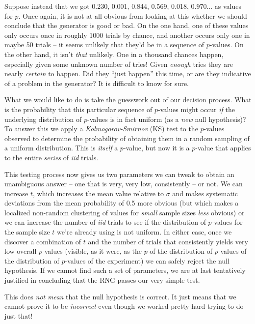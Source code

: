 \documentclass[12pt]{book}
\begin{document}
Suppose instead that we got 0.230, 0.001, 0.844, 0.569, 0.018, 0.970...
as values for $p$.  Once again, it is not at all obvious from looking at
this whether we should conclude that the generator is good or bad.  On
the one hand, one of these values only occurs once in roughly 1000
trials by chance, and another occurs only one in maybe 50 trials -- it
seems unlikely that they'd be in a sequence of $p$-values.  On the other
hand, it isn't {\em that} unlikely.  One in a thousand chances happen,
especially given some unknown number of tries!  Given \emph{enough}
tries they are nearly \emph{certain} to happen.  Did they ``just
happen'' this time, or are they indicative of a problem in the
generator?  It is difficult to know for sure.

What we would like to do is take the guesswork out of our decision
process.  What is the probability that this particular sequence of
$p$-values might occur {\em if} the underlying distribution of
$p$-values is in fact uniform (as a {\em new} null hypothesis)?  To
answer this we apply a {\em Kolmogorov-Smirnov} (KS) test to the
$p$-values observed to determine the probability of obtaining them in a
random sampling of a uniform distribution.  This is {\em itself} a
$p$-value, but now it is a $p$-value that applies to the entire {\em
series} of {\em iid} trials.

This testing process now gives us two parameters we can tweak to obtain
an unambiguous answer -- one that is very, very low, consistently -- or
not.  We can increase $t$, which increases the mean value relative to
$\sigma$ and makes systematic deviations from the mean probability of 0.5
more obvious (but which makes a localized non-random clustering of
values for {\em small} sample sizes {\em less} obvious) or we can
increase the number of {\em iid} trials to see if the distribution of
$p$-values for the sample size $t$ we're already using is not uniform.
In either case, once we discover a combination of $t$ and the number of
trials that consistently yields very low overall $p$-values (visible, as
it were, as the $p$ of the distribution of $p$-values of the
distribution of $p$-values of the experiment) we can safely reject the
null hypothesis.  If we cannot find such a set of parameters, we are at
last tentatively justified in concluding that the RNG passes our very
simple test.  

This does {\em not mean} that the null hypothesis is correct.  It just
means that we cannot prove it to be {\em incorrect} even though we
worked pretty hard trying to do just that!
\end{document}
